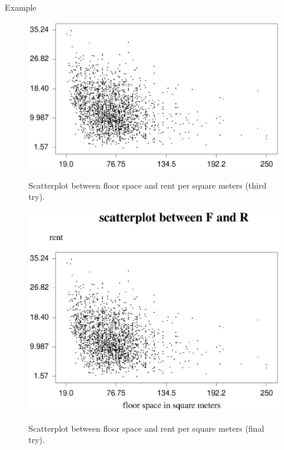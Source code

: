 \begin{stanza}{Example}
{\begin{figure}[ht]
\begin{center}
\includegraphics[scale=0.7]{grafiken/plotrf3.ps}
{\em\caption{ \label{plotrf3} Scatterplot between floor space and
rent per square meters (third try).}}
\end{center}
\end{figure}

\begin{figure}[ht]
\begin{center}
\includegraphics[scale=0.7]{grafiken/plotrf4.ps}
{\em\caption{ \label{plotrf4} Scatterplot between floor space and
rent per square meters (final try).}}
\end{center}
\end{figure}
}
\end{stanza}
\clearpage




